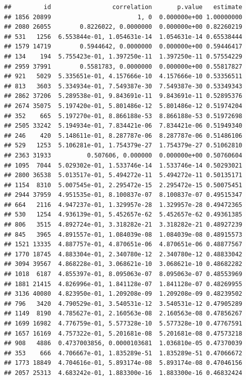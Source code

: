 \documentclass[
]{article}
\begin{document}
\begin{verbatim}
##         id                 correlation       p.value   estimate
## 1856 20899                        1, 0  0.000000e+00 1.00000000
## 2080 26055        0.8226022, 0.0000000  0.000000e+00 0.82260219
## 531   1256  6.553844e-01, 1.054631e-14  1.054631e-14 0.65538444
## 1579 14719        0.5944642, 0.0000000  0.000000e+00 0.59446417
## 134    194  5.755423e-01, 1.397250e-11  1.397250e-11 0.57554229
## 2959 37991        0.5581783, 0.0000000  0.000000e+00 0.55817827
## 921   5029  5.335651e-01, 4.157666e-10  4.157666e-10 0.53356511
## 813   3603  5.334934e-01, 7.549387e-30  7.549387e-30 0.53349343
## 2862 37206  5.289538e-01, 9.843691e-11  9.843691e-11 0.52895376
## 2674 35075  5.197420e-01, 5.801486e-12  5.801486e-12 0.51974204
## 352    665  5.197270e-01, 8.866188e-53  8.866188e-53 0.51972698
## 2505 33242  5.194934e-01, 7.834421e-06  7.834421e-06 0.51949340
## 246    420  5.148611e-01, 8.287787e-06  8.287787e-06 0.51486106
## 529   1253  5.106281e-01, 1.754379e-27  1.754379e-27 0.51062810
## 2363 31933          0.507606, 0.000000  0.000000e+00 0.50760604
## 1095  7044  5.029302e-01, 1.533746e-14  1.533746e-14 0.50293021
## 2800 36538  5.013517e-01, 5.494272e-11  5.494272e-11 0.50135171
## 1154  8310  5.007545e-01, 2.295472e-15  2.295472e-15 0.50075451
## 2944 37959  4.951535e-01, 8.100837e-07  8.100837e-07 0.49515347
## 664   2116  4.947237e-01, 1.329957e-28  1.329957e-28 0.49472365
## 530   1254  4.936139e-01, 5.452657e-62  5.452657e-62 0.49361385
## 806   3515  4.892724e-01, 3.318282e-21  3.318282e-21 0.48927239
## 845   3965  4.891557e-01, 1.084039e-08  1.084039e-08 0.48915573
## 1521 13335  4.887757e-01, 4.870651e-06  4.870651e-06 0.48877567
## 1770 18745  4.883304e-01, 2.340780e-12  2.340780e-12 0.48833042
## 3094 39567  4.868228e-01, 3.068621e-10  3.068621e-10 0.48682282
## 1018  6187  4.855397e-01, 8.095063e-07  8.095063e-07 0.48553969
## 1881 21415  4.826996e-01, 1.841128e-07  1.841128e-07 0.48269955
## 3136 40080  4.823950e-01, 1.209208e-09  1.209208e-09 0.48239502
## 796   3420  4.790529e-01, 3.540531e-12  3.540531e-12 0.47905289
## 1149  8190  4.785627e-01, 2.160563e-08  2.160563e-08 0.47856267
## 1699 16982  4.776759e-01, 5.577328e-10  5.577328e-10 0.47767591
## 1657 16169  4.757322e-01, 5.201681e-08  5.201681e-08 0.47573218
## 908   4886  0.4737003856, 0.0000103681  1.036810e-05 0.47370039
## 353    666  4.706667e-01, 1.835289e-51  1.835289e-51 0.47066672
## 1773 18849  4.704616e-01, 5.893174e-08  5.893174e-08 0.47046156
## 2057 25313  4.683242e-01, 1.883300e-16  1.883300e-16 0.46832424

\end{verbatim}
\end{document}

